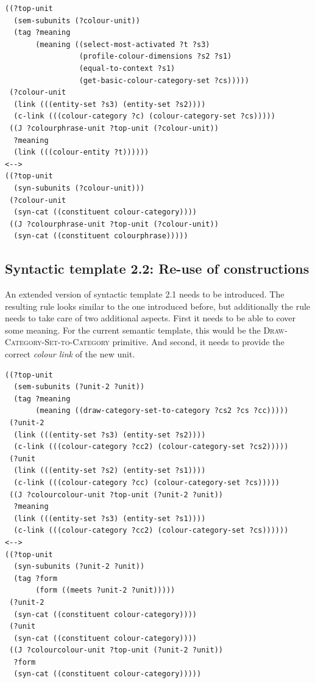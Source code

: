 \footnotesize
\begin{Verbatim}[frame=lines, label=ColourPhrase rule for Basic Colour Strategy]
((?top-unit
  (sem-subunits (?colour-unit))
  (tag ?meaning
       (meaning ((select-most-activated ?t ?s3)
                 (profile-colour-dimensions ?s2 ?s1)
                 (equal-to-context ?s1)
                 (get-basic-colour-category-set ?cs)))))
 (?colour-unit
  (link (((entity-set ?s3) (entity-set ?s2))))
  (c-link (((colour-category ?c) (colour-category-set ?cs)))))
 ((J ?colourphrase-unit ?top-unit (?colour-unit))
  ?meaning
  (link (((colour-entity ?t))))))
<-->
((?top-unit 
  (syn-subunits (?colour-unit)))
 (?colour-unit 
  (syn-cat ((constituent colour-category))))
 ((J ?colourphrase-unit ?top-unit (?colour-unit))
  (syn-cat ((constituent colourphrase)))))
\end{Verbatim}
\normalsize

\subsection{Syntactic template 2.2: Re-use of constructions}

An extended version of syntactic template 2.1 needs to be
introduced. The resulting rule looks similar to the one introduced
before, but additionally the rule needs to take care of two
additional aspects. First it needs to be able to cover some
meaning. For the current semantic template, this would be the
\textsc{Draw-Category-Set-to-Category} primitive. And second, it needs
to provide the correct \emph{colour link} of the new unit.

\footnotesize
\begin{Verbatim}[frame=lines, label=ColourColour rule]
((?top-unit
  (sem-subunits (?unit-2 ?unit))
  (tag ?meaning
       (meaning ((draw-category-set-to-category ?cs2 ?cs ?cc)))))
 (?unit-2
  (link (((entity-set ?s3) (entity-set ?s2))))
  (c-link (((colour-category ?cc2) (colour-category-set ?cs2)))))
 (?unit
  (link (((entity-set ?s2) (entity-set ?s1))))
  (c-link (((colour-category ?cc) (colour-category-set ?cs)))))
 ((J ?colourcolour-unit ?top-unit (?unit-2 ?unit))
  ?meaning
  (link (((entity-set ?s3) (entity-set ?s1))))
  (c-link (((colour-category ?cc2) (colour-category-set ?cs))))))
<-->
((?top-unit
  (syn-subunits (?unit-2 ?unit))
  (tag ?form 
       (form ((meets ?unit-2 ?unit)))))
 (?unit-2 
  (syn-cat ((constituent colour-category))))
 (?unit 
  (syn-cat ((constituent colour-category))))
 ((J ?colourcolour-unit ?top-unit (?unit-2 ?unit))
  ?form
  (syn-cat ((constituent colour-category)))))
\end{Verbatim}
\normalsize

